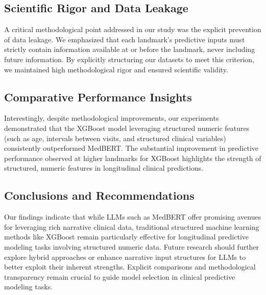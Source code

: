 \subsection{Scientific Rigor and Data Leakage}
A critical methodological point addressed in our study was the explicit prevention of data leakage. We emphasized that each landmark's 
predictive inputs must strictly contain information available at or before the landmark, never including future information. 
By explicitly structuring our datasets to meet this criterion, we maintained high methodological rigor and ensured scientific validity.

\subsection{Comparative Performance Insights}
Interestingly, despite methodological improvements, our experiments demonstrated that the XGBoost model leveraging structured numeric features 
(such as age, intervals between visits, and structured clinical variables) consistently outperformed MedBERT. The substantial improvement in 
predictive performance observed at higher landmarks for XGBoost highlights the strength of structured, numeric features in longitudinal clinical predictions.

\subsection{Conclusions and Recommendations}
Our findings indicate that while LLMs such as MedBERT offer promising avenues for leveraging rich narrative clinical data, traditional 
structured machine learning methods like XGBoost remain particularly effective for longitudinal predictive modeling tasks involving structured 
numeric data. Future research should further explore hybrid approaches or enhance narrative input structures for LLMs to better exploit their 
inherent strengths. Explicit comparisons and methodological transparency remain crucial to guide model selection in clinical predictive modeling tasks.

